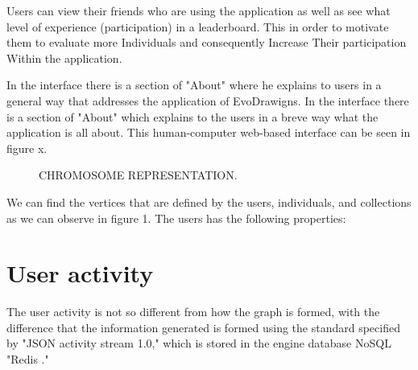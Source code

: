 Users can view their friends who are using the application as well as see what level of experience (participation) in a leaderboard. This in order to motivate them to evaluate more Individuals and consequently Increase Their participation Within the application.

In the interface there is a section of "About" where he explains to users in a general way that addresses the application of EvoDrawigns. In the interface there is a section of "About" which explains to the  users in a breve way what the application is all about. This human-computer web-based interface can be seen in figure x.



\begin{figure}
\captionsetup{justification=centering,margin=2cm}
\centering
\setlength\fboxsep{0pt}
\setlength\fboxrule{0.7pt}
\caption{CHROMOSOME REPRESENTATION.}
\label{fig:chromosome}       
\end{figure}



We can find the vertices that are defined by the users, individuals, and collections as we can observe in figure 1. The users has the following properties:

\section{User activity}
The user activity is not so different from how the graph is formed, with the difference that the information generated is formed using the standard specified by "JSON activity stream 1.0," which is stored in the engine database NoSQL "Redis ."

